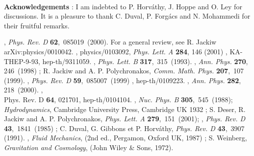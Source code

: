 \documentclass[11pt,a4paper]{article}
\begin{document}
\\
\noindent
{\bf Acknowledgements} : I am indebted to P. Horv\'athy, J. Hoppe and O. Ley for discussions. It is a pleasure to thank C. Duval, P. Forg\'acs and N. Mohammedi for their fruitful remarks.










\begin{thebibliography}{2}
, {\em Phys. Rev. D} {\bf 62},\, 085019\, (2000). For a general review, see {\sc R. Jackiw} arXiv:physics/0010042. 
, physics/0103092, {\em
Phys. Lett. A} {\bf 284}, 146 (2001)
, KA-THEP-9-93, hep-th/9311059.
, {\em Phys. Lett. B} {\bf 317},\, 315\, (1993).
,
{\em Ann. Phys.} {\bf 270},\, 246\, (1998) ; {\sc R. Jackiw and A. P. Polychronakos}, {\em
Comm. Math. Phys.} {\bf 207},\, 107\,(1999).
, {\em Phys. Rev. D} {\bf 59},\, 085007\, (1999) 
, hep-th/0109223.
, {\em
Ann.
Phys.} {\bf 282},\, 218\, (2000).
, \\
Phys. Rev. D {\bf 64}, 021701, hep-th/0104104.
, {\em Nuc. Phys. B} {\bf 305},\, 545\, (1988); 
 {\it Hydrodynamics}, Cambridge University Press, Cambridge UK 1932 ; {\sc S. Deser, R. Jackiw and A. P. Polychronakos}, {\em Phys. Lett. A} {\bf 279},\, 151\, (2001); 
, {\em Phys. Rev. D} {\bf 43},\, 1841\, (1985) ; {\sc C. Duval, G. Gibbons et P. Horv\'athy}, {\em Phys. Rev. D} {\bf 43},\, 3907\, (1991).
, {\em Fluid Mechanics}, (2nd ed., Pergamon, Oxford UK, 1987) ; {\sc S. Weinberg}, {\em Gravitation and Cosmology}, (John Wiley \& Sons, 1972).


\end{thebibliography}
\end{document}
